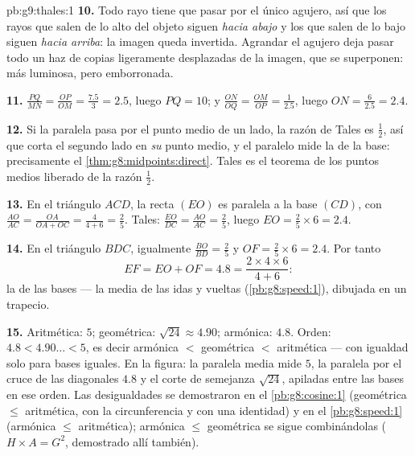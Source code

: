 \begin{solution}{pb:g9:thales:1}
\textbf{10.} Todo rayo tiene que pasar por el único agujero, así que los rayos
que salen de lo alto del objeto siguen \emph{hacia abajo} y los que salen de
lo bajo siguen \emph{hacia arriba}: la imagen queda invertida. Agrandar
el agujero deja pasar todo un haz de copias ligeramente desplazadas
de la imagen, que se superponen: más luminosa, pero emborronada.

\textbf{11.} $\frac{PQ}{MN} = \frac{OP}{OM} = \frac{7.5}{3}
= 2.5$, luego $PQ = 10$; y $\frac{ON}{OQ} = \frac{OM}{OP} =
\frac{1}{2.5}$, luego $ON = \frac{6}{2.5} = 2.4$.

\textbf{12.} Si la paralela pasa por el punto medio de un
lado, la razón de Tales es $\frac12$, así que corta el segundo lado
en \emph{su} punto medio, y el  paralelo mide la 
de la base: precisamente el \cref{thm:g8:midpoints:direct}. Tales es
el teorema de los puntos medios liberado de la razón $\frac12$.

\textbf{13.} En el triángulo $ACD$, la recta $(EO)$ es paralela
a la base $(CD)$, con $\frac{AO}{AC} = \frac{OA}{OA + OC} =
\frac{4}{4 + 6} = \frac25$. Tales:
$\frac{EO}{DC} = \frac{AO}{AC} = \frac25$, luego
$EO = \frac25 \times 6 = 2.4$.

\textbf{14.} En el triángulo $BDC$, igualmente
$\frac{BO}{BD} = \frac25$ y $OF = \frac25 \times 6 = 2.4$.
Por tanto
\[
EF = EO + OF = 4.8
= \frac{2 \times 4 \times 6}{4 + 6} :
\]
la  de las bases --- la media de las idas y vueltas
(\cref{pb:g8:speed:1}), dibujada en un trapecio.

\textbf{15.} Aritmética: $5$; geométrica:
$\sqrt{24} \approx 4.90$; armónica: $4.8$. Orden:
$4.8 < 4.90\ldots < 5$, es decir armónica $<$ geométrica $<$
aritmética --- con igualdad solo para bases iguales. En la
figura: la paralela media mide $5$, la paralela por el
cruce de las diagonales $4.8$ y el corte de semejanza
$\sqrt{24}$, apiladas entre las bases en ese orden. Las
desigualdades se demostraron en el \cref{pb:g8:cosine:1} (geométrica
$\leq$ aritmética, con la circunferencia y con una identidad) y en el
\cref{pb:g8:speed:1} (armónica $\leq$ aritmética); armónica
$\leq$ geométrica se sigue combinándolas ($H \times A = G^2$,
demostrado allí también).
\end{solution}
